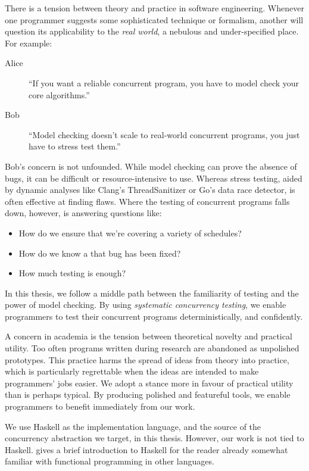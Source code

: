 There is a tension between theory and practice in software
engineering.  Whenever one programmer suggests some sophisticated
technique or formalism, another will question its applicability to the
\emph{real world}, a nebulous and under-specified place.  For example:

\begin{description}
\item[Alice] ``If you want a reliable concurrent program, you have to
  model check your core algorithms.''
\item[Bob] ``Model checking doesn't scale to real-world concurrent
  programs, you just have to stress test them.''
\end{description}

Bob's concern is not unfounded.  While model checking can prove the
absence of bugs, it can be difficult or resource-intensive to use.
Whereas stress testing, aided by dynamic analyses like Clang's
ThreadSanitizer\cite{serebryany2009} or Go's data race
detector\cite{golang2017}, is often effective at finding flaws.  Where
the testing of concurrent programs falls down, however, is answering
questions like:

\begin{itemize}
\item How do we ensure that we're covering a variety of schedules?
\item How do we know a that bug has been fixed?
\item How much testing is enough?
\end{itemize}

In this thesis, we follow a middle path between the familiarity of
testing and the power of model checking.  By using \emph{systematic
  concurrency testing}, we enable programmers to test their concurrent
programs deterministically, and confidently.

A concern in academia is the tension between theoretical novelty and
practical utility.  Too often programs written during research are
abandoned as unpolished prototypes.  This practice harms the spread of
ideas from theory into practice, which is particularly regrettable
when the ideas are intended to make programmers' jobs easier.  We
adopt a stance more in favour of practical utility than is perhaps
typical.  By producing polished and featureful tools, we enable
programmers to benefit immediately from our work.

We use Haskell as the implementation language, and the source of the
concurrency abstraction we target, in this thesis.  However, our work
is not tied to Haskell.   gives a brief introduction
to Haskell for the reader already somewhat familiar with functional
programming in other languages.

